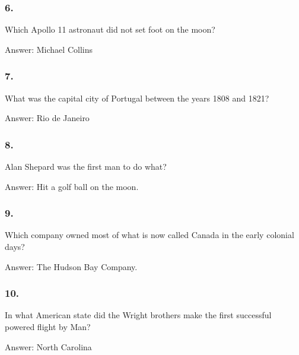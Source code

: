 \documentclass{beamer}
\begin{document}
    \begin{frame}
        \frametitle{6.}
        Which Apollo 11 astronaut did not set foot on the moon?\\

        \begin{center}
            Answer: Michael Collins
        \end{center}
    \end{frame}

    \begin{frame}
        \frametitle{7.}
        What was the capital city of Portugal between the years 1808 and
        1821?\\

        \begin{center}
            Answer: Rio de Janeiro
        \end{center}
    \end{frame}

    \begin{frame}
        \frametitle{8.}
        Alan Shepard was the first man to do what?\\

        \begin{center}
            Answer: Hit a golf ball on the moon.
        \end{center}
    \end{frame}

    \begin{frame}
        \frametitle{9.}
        Which company owned most of what is now called Canada in the early
        colonial days?\\

        \begin{center}
            Answer: The Hudson Bay Company.
        \end{center}
    \end{frame}

    \begin{frame}
        \frametitle{10.}
        In what American state did the Wright brothers make the first
        successful powered flight by Man?\\

        \begin{center}
            Answer: North Carolina
        \end{center}
    \end{frame}
\end{document}
